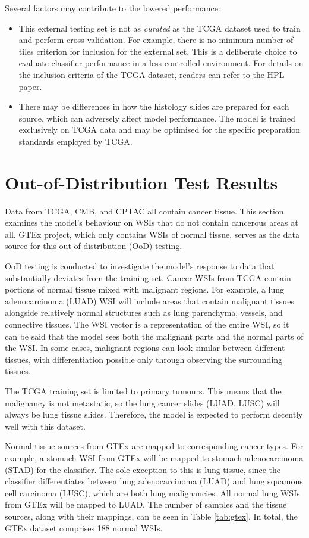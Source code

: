 \documentclass{l4proj}
\begin{document}
Several factors may contribute to the lowered performance:
\begin{itemize}
    \item This external testing set is not as \emph{curated} as the TCGA dataset used to train and perform cross-validation. For example, there is no minimum number of tiles criterion for inclusion for the external set. This is a deliberate choice to evaluate classifier performance in a less controlled environment. For details on the inclusion criteria of the TCGA dataset, readers can refer to the HPL paper.
    \item There may be differences in how the histology slides are prepared for each source, which can adversely affect model performance. The model is trained exclusively on TCGA data and may be optimised for the specific preparation standards employed by TCGA.
\end{itemize}

\section{Out-of-Distribution Test Results} \label{sec:ood-results}
Data from TCGA, CMB, and CPTAC all contain cancer tissue. This section examines the model's behaviour on WSIs that do not contain cancerous areas at all. GTEx project, which only contains WSIs of normal tissue, serves as the data source for this out-of-distribution (OoD) testing.

OoD testing is conducted to investigate the model's response to data that substantially deviates from the training set. Cancer WSIs from TCGA contain portions of normal tissue mixed with malignant regions. For example, a lung adenocarcinoma (LUAD) WSI will include areas that contain malignant tissues alongside relatively normal structures such as lung parenchyma, vessels, and connective tissues. The WSI vector is a representation of the entire WSI, so it can be said that the model sees both the malignant parts and the normal parts of the WSI. In some cases, malignant regions can look similar between different tissues, with differentiation possible only through observing the surrounding tissues. 

The TCGA training set is limited to primary tumours. This means that the malignancy is not metastatic, so the lung cancer slides (LUAD, LUSC) will always be lung tissue slides. Therefore, the model is expected to perform decently well with this dataset.

Normal tissue sources from GTEx are mapped to corresponding cancer types. For example, a stomach WSI from GTEx will be mapped to stomach adenocarcinoma (STAD) for the classifier. The sole exception to this is lung tissue, since the classifier differentiates between lung adenocarcinoma (LUAD) and lung squamous cell carcinoma (LUSC), which are both lung malignancies. All normal lung WSIs from GTEx will be mapped to LUAD. The number of samples and the tissue sources, along with their mappings, can be seen in Table \ref{tab:gtex}. In total, the GTEx dataset comprises 188 normal WSIs.
\end{document}
